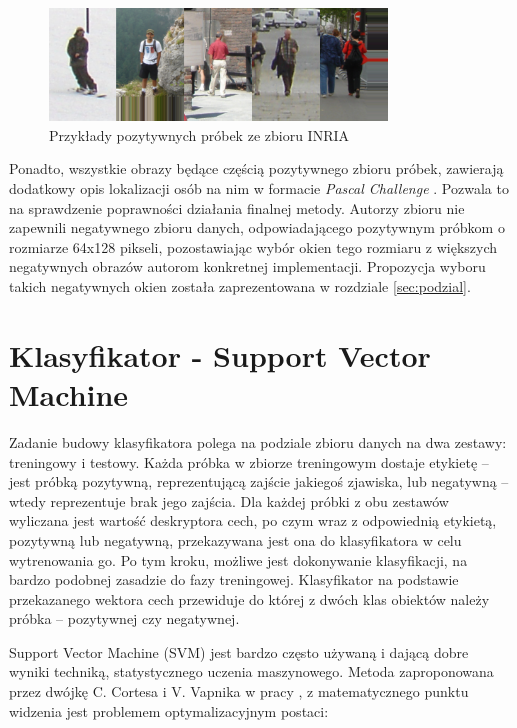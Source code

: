 \begin{figure}[htb]
\centering
\includegraphics[width=0.8\textwidth]{ch3_inria.png}
\caption{Przykłady pozytywnych próbek ze zbioru INRIA}
\label{fig:inria}
\end{figure}

Ponadto, wszystkie obrazy będące częścią pozytywnego zbioru próbek, zawierają dodatkowy opis lokalizacji osób na nim w formacie \textit{Pascal Challenge} \cite{Pascal_Challenge}. Pozwala to na sprawdzenie poprawności działania finalnej metody.
Autorzy zbioru nie zapewnili negatywnego zbioru danych, odpowiadającego pozytywnym próbkom o rozmiarze 64x128 pikseli, pozostawiając wybór okien tego rozmiaru z większych negatywnych obrazów autorom konkretnej implementacji. Propozycja wyboru takich negatywnych okien została zaprezentowana w rozdziale \ref{sec:podzial}.


\section{Klasyfikator - Support Vector Machine}
\label{sec:svm}

Zadanie budowy klasyfikatora polega na podziale zbioru danych na dwa zestawy: treningowy i testowy. Każda próbka w zbiorze treningowym dostaje etykietę – jest próbką pozytywną, reprezentującą zajście jakiegoś zjawiska, lub negatywną – wtedy reprezentuje brak jego zajścia. Dla każdej próbki z obu zestawów wyliczana jest wartość deskryptora cech, po czym wraz z odpowiednią etykietą, pozytywną lub negatywną, przekazywana jest ona do klasyfikatora w celu wytrenowania go. Po tym kroku, możliwe jest dokonywanie klasyfikacji, na bardzo podobnej zasadzie do fazy treningowej. Klasyfikator na podstawie przekazanego wektora cech przewiduje do której z dwóch klas obiektów należy próbka – pozytywnej czy negatywnej.

Support Vector Machine (SVM) jest bardzo często używaną i dającą dobre wyniki techniką, statystycznego uczenia maszynowego. Metoda zaproponowana przez dwójkę C. Cortesa i V. Vapnika w pracy \cite{Cortes95}, z matematycznego punktu widzenia jest problemem optymalizacyjnym postaci:\\

